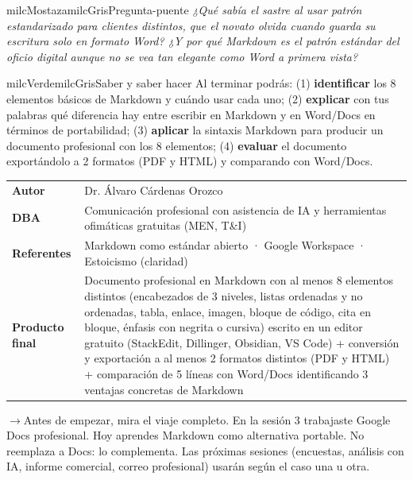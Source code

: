 \documentclass[11pt,letterpaper]{article}
\newcommand{\puente}[1]{%
  \begin{puentebox}%
    \textcolor{milcGradeDark}{$\rightarrow$}\hspace{2mm}#1%
  \end{puentebox}%
}
\begin{document}
\begin{softbox}{milcMostaza}{milcGris}{Pregunta-puente}
\textit{¿Qué sabía el sastre al usar patrón estandarizado para clientes distintos, que el novato olvida cuando guarda su escritura solo en formato Word? ¿Y por qué Markdown es el patrón estándar del oficio digital aunque no se vea tan elegante como Word a primera vista?}
\end{softbox}

\begin{softbox}{milcVerde}{milcGris}{Saber y saber hacer}
Al terminar podrás: (1) \textbf{identificar} los 8 elementos básicos de Markdown y cuándo usar cada uno; (2) \textbf{explicar} con tus palabras qué diferencia hay entre escribir en Markdown y en Word/Docs en términos de portabilidad; (3) \textbf{aplicar} la sintaxis Markdown para producir un documento profesional con los 8 elementos; (4) \textbf{evaluar} el documento exportándolo a 2 formatos (PDF y HTML) y comparando con Word/Docs.
\end{softbox}



\small
\begin{tabularx}{\textwidth}{>{\bfseries}p{3.0cm}Y}
Autor & Dr. Álvaro Cárdenas Orozco\\
DBA & Comunicación profesional con asistencia de IA y herramientas ofimáticas gratuitas (MEN, T\&I)\\
Referentes & Markdown como estándar abierto · Google Workspace · Estoicismo (claridad)\\
Producto final & Documento profesional en Markdown con al menos 8 elementos distintos (encabezados de 3 niveles, listas ordenadas y no ordenadas, tabla, enlace, imagen, bloque de código, cita en bloque, énfasis con negrita o cursiva) escrito en un editor gratuito (StackEdit, Dillinger, Obsidian, VS Code) + conversión y exportación a al menos 2 formatos distintos (PDF y HTML) + comparación de 5 líneas con Word/Docs identificando 3 ventajas concretas de Markdown\\
\end{tabularx}
\normalsize

\puente{Antes de empezar, mira el viaje completo. En la sesión 3 trabajaste Google Docs profesional. Hoy aprendes Markdown como alternativa portable. No reemplaza a Docs: lo complementa. Las próximas sesiones (encuestas, análisis con IA, informe comercial, correo profesional) usarán según el caso una u otra.}
\end{document}
